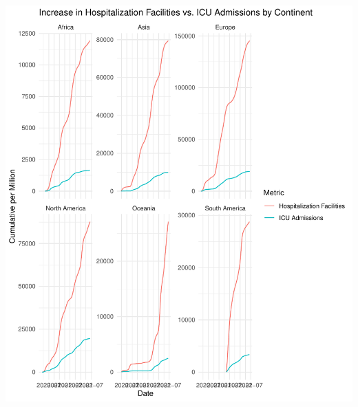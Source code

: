 \documentclass[12pt,preprint, authoryear]{elsarticle}
\let\origfigure\figure
\let\endorigfigure\endfigure
\renewenvironment{figure}[1][2] {
    \expandafter\origfigure\expandafter[H]
} {
    \endorigfigure
}
\numberwithin{equation}{section}
\numberwithin{figure}{section}
\numberwithin{table}{section}
\begin{document}
\begin{figure}

{\centering \includegraphics{Q1_files/figure-latex/Figure5-1} 

}

\caption{Hospitalization VS ICU Admissions  \label{Figure5}}\label{fig:Figure5}
\end{figure}

\begin{Shaded}
\begin{Highlighting}[]
\end{Highlighting}
\end{Shaded}
\end{document}
